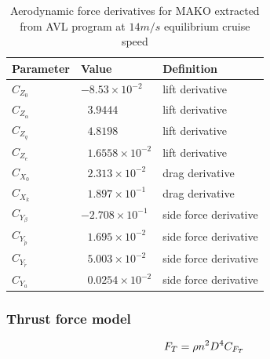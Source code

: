 \begin{table}
\label{arm:forcesMAKO}
\caption{Aerodynamic force derivatives for MAKO extracted from AVL program at $14 m/s$ equilibrium cruise speed \cite{bronz2016aerodynamic}}
\label{arm:MAKO}
\begin{center}
\begin{tabular}{ ||p{3cm}|p{3cm}|p{4cm}||}\hline
\textbf{Parameter} & \textbf{Value} & \textbf{Definition} \\\hline
$C_{Z_0}$                             & $-8.53 \times 10^{-2}$	         & lift derivative \\\hline
$C_{Z_{\alpha}}$                   & $\ \ \,3.9444$                               & lift derivative \\\hline
$C_{Z_q}$                             & $\ \ \,4.8198$	       		         & lift derivative \\\hline
$C_{Z_e}$                             & $\ \ \,1.6558 \times 10^{-2}$        & lift derivative \\\hline
$C_{X_0}$                             & $\ \ \, 2.313 \times 10^{-2}$	   & drag derivative \\\hline
$C_{X_k}$                              & $\ \ \, 1.897 \times 10^{-1}$          & drag derivative \\\hline
$C_{Y_\beta}$ 			     & $-2.708 \times 10^{-1}$             & side force derivative \\\hline
$C_{Y_{\tilde{p}}}$                 & $\ \ \, 1.695 \times 10^{-2}$	& side force derivative \\\hline
$C_{Y_{\tilde{r}}}$                  & $\ \ \, 5.003 \times 10^{-2}$ 	& side force derivative \\\hline
$C_{Y_a}$                             & $\ \ \, 0.0254 \times 10^{-2}$	& side force derivative \\\hline
\end{tabular}
\end{center}
\end{table}


\subsubsection{Thrust force model}

\begin{equation}{\label{eqn:thrustModel}}
F_T = \rho n^2 D^4 C_{F_T}
\end{equation}

